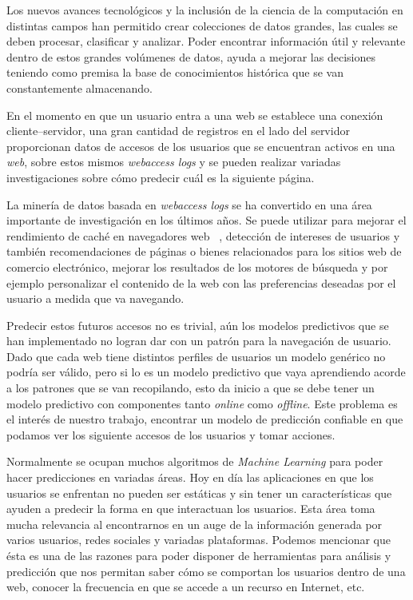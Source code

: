 {
Los nuevos avances tecnológicos y la inclusión de la ciencia de la computación en distintas campos han permitido crear colecciones de datos grandes, las cuales se deben procesar, clasificar y analizar. Poder encontrar información útil y relevante dentro de estos grandes volúmenes de datos, ayuda a mejorar las decisiones teniendo como premisa la base de conocimientos histórica que se van constantemente almacenando.

En el momento en que un usuario entra a una web se establece una conexión cliente--servidor, una gran cantidad de registros en el lado del servidor proporcionan datos de accesos de los usuarios que se encuentran activos en una \emph{web}, sobre estos mismos \emph{webaccess logs} y se pueden realizar variadas investigaciones sobre cómo predecir cuál es la siguiente página. 

La minería de datos basada en \emph{webaccess logs} se ha convertido en una área importante de investigación en los últimos años. Se puede utilizar para mejorar el rendimiento de caché en navegadores web \etal~\cite{Moghaddam2009},  detección de intereses de usuarios y también recomendaciones de páginas o bienes relacionados para los sitios web de comercio electrónico, mejorar los resultados de los motores de búsqueda y por ejemplo personalizar el contenido de la web con las preferencias deseadas por el usuario a medida que va navegando.

Predecir estos futuros accesos no es trivial, aún los modelos predictivos que se han implementado no logran dar con un patrón para la navegación de usuario. Dado que cada web tiene distintos perfiles de usuarios un modelo genérico no podría ser válido, pero si lo es un modelo predictivo que vaya aprendiendo acorde a los patrones que se van recopilando, esto da inicio a que se debe tener un modelo predictivo con componentes tanto \emph{online} como \emph{offline}. Este problema es el interés de nuestro trabajo, encontrar un modelo de predicción confiable en que podamos ver los siguiente accesos de los usuarios y tomar acciones. 

Normalmente se ocupan muchos algoritmos de \emph{Machine Learning} para poder hacer predicciones en variadas áreas. Hoy en día las aplicaciones en que los usuarios se enfrentan no pueden ser estáticas y sin tener un características que ayuden a predecir la forma en que interactuan los usuarios. Esta área toma mucha relevancia al encontrarnos en un auge de la información generada por varios usuarios, redes sociales y variadas plataformas. Podemos mencionar que ésta es una de las razones para poder disponer de herramientas para análisis y predicción que nos permitan saber cómo se comportan los usuarios dentro de una web, conocer la frecuencia en que se accede a un recurso en Internet, etc. 

}
